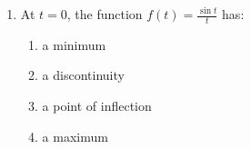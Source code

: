 \documentclass[journal]{IEEEtran}
\numberwithin{equation}{enumi}
\numberwithin{figure}{enumi}
\begin{document}
\begin{enumerate}
\begin{figure}[H]
			\centering
			
			\caption{}
			\label{fig:9}
		\end{figure}
    \begin{enumerate}
    \end{enumerate}

    \item At $t = 0$, the function $f(t) = \frac{\sin t}{t}$ has:
    \begin{enumerate}
        \item a minimum
        \item a discontinuity
        \item a point of inflection
        \item a maximum
    \end{enumerate}

\end{enumerate}
\end{document}
